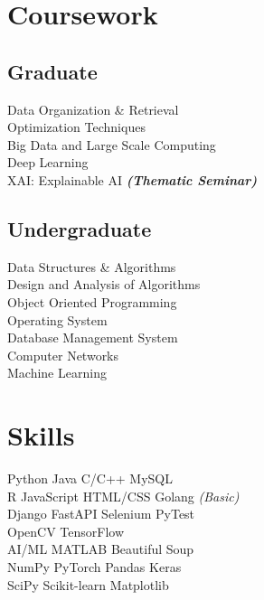 \documentclass[]{deedy-resume-openfont}
\begin{document}
\begin{minipage}[t]{0.35\textwidth}
\section{Coursework}
\subsection{Graduate}
Data Organization \& Retrieval \\
Optimization Techniques \\
Big Data and Large Scale Computing \\
Deep Learning \\
XAI: Explainable AI {\footnotesize \textit{\textbf{(Thematic Seminar) }}}
\sectionsep

\subsection{Undergraduate}
Data Structures \& Algorithms \\
Design and Analysis of Algorithms \\
Object Oriented Programming \\
Operating System \\
Database Management System \\
Computer Networks \\
Machine Learning \\


\section{Skills}
Python \textbullet{} Java \textbullet{} C/C++ \textbullet{} MySQL \\
R \textbullet{} JavaScript \textbullet{} HTML/CSS \textbullet{} Golang {\footnotesize \textit{(Basic)}}\\ 
Django \textbullet{} FastAPI \textbullet{} Selenium \textbullet{} PyTest \\ OpenCV \textbullet{} TensorFlow \\
AI/ML \textbullet{}  MATLAB \textbullet{} Beautiful Soup \\ 
NumPy \textbullet{} PyTorch \textbullet{} Pandas \textbullet{} Keras \\
SciPy \textbullet{} Scikit-learn \textbullet{} Matplotlib
\sectionsep


\end{minipage}
\end{document}
